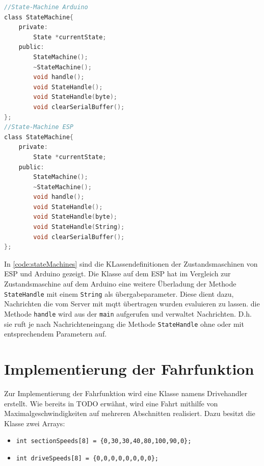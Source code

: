 \begin{lstlisting}[language=c, style=dhpaperdefault]
//State-Machine Arduino
class StateMachine{
	private:
		State *currentState;
	public:
		StateMachine();
		~StateMachine();
		void handle();
		void StateHandle();
		void StateHandle(byte);
		void clearSerialBuffer();
};
//State-Machine ESP
class StateMachine{
	private:
		State *currentState;
	public:
		StateMachine();
		~StateMachine();
		void handle();
		void StateHandle();
		void StateHandle(byte);
		void StateHandle(String);
		void clearSerialBuffer();
};
\end{lstlisting}

In \autoref{code:stateMachines} sind die KLassendefinitionen der Zustandsmaschinen von ESP und Arduino gezeigt. Die Klasse auf dem ESP hat im Vergleich zur Zustandsmaschine auf dem Arduino eine weitere Überladung der Methode \texttt{StateHandle} mit einem \texttt{String} als übergabeparameter. Diese dient dazu, Nachrichten die vom Server mit \acrshort{mqtt} übertragen wurden evaluieren zu lassen. die Methode \texttt{handle} wird aus der \texttt{main} aufgerufen und verwaltet Nachrichten. D.h. sie ruft je nach Nachrichteneingang die Methode \texttt{StateHandle} ohne oder mit entsprechendem Parametern auf. 

\chapter{Implementierung der Fahrfunktion}
Zur Implementierung der Fahrfunktion wird eine Klasse namens Drivehandler erstellt. Wie bereits in TODO erwähnt, wird eine Fahrt mithilfe von Maximalgeschwindigkeiten auf mehreren Abschnitten realisiert. Dazu besitzt die Klasse zwei Arrays: 

\begin{center}
	\begin{itemize}
		\item \texttt{int sectionSpeeds[8] = \{0,30,30,40,80,100,90,0\};}
		\item \texttt{int driveSpeeds[8] = \{0,0,0,0,0,0,0,0\};}
	\end{itemize}
\end{center}


